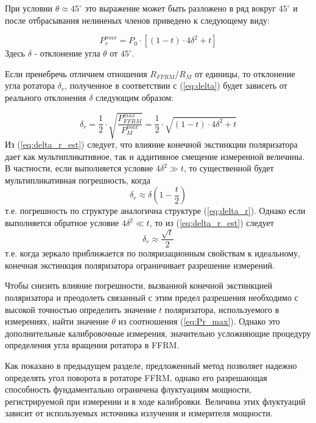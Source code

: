 \documentclass{article}
\begin{document}
При условии $\theta \approx 45^\circ$ это выражение может быть разложено в ряд вокруг $45^\circ$ и после отбрасывания нелиненых членов приведено к следующему виду: 

\begin{equation}
    \label{eq:Pr_max_1}
    P_r^{max}=P_0\cdot\left[(1-t)\cdot4\delta^2+t\right]
\end{equation}
Здесь $\delta$ - отклонение угла $\theta$ от $45^\circ$.

Если пренебречь отличием отношения $R_{FFRM}/R_M $ от единицы, то отклонение угла ротатора $\delta_r$, полученное в соответствии с (\ref{eq:delta}) будет зависеть от реального отклонения $\delta$ следующим образом:

\begin{equation}
    \label{eq:delta_r_est}
    \delta_r=\frac{1}{2}\cdot\sqrt{\frac{P_{FFRM}^{max}}{P_M^{max}}}=\frac{1}{2}\cdot\sqrt{(1-t)\cdot4\delta^2+t}
\end{equation}
Из (\ref{eq:delta_r_est}) следует, что влияние конечной экстинкции поляризатора дает как мультипликативное, так и аддитивное смещение измеренной величины. В частности, если выполняется условие $4\delta^2 \gg t$, то существенной будет мультипликативная погрешность, когда
\begin{equation}
    \delta_r\approx\delta\left(1-\frac{t}{2}\right)
\end{equation}
т.е. погрешность по структуре аналогична структуре (\ref{eq:delta_r}). Однако если выполняется обратное условие $4\delta^2\ll t$, то из (\ref{eq:delta_r_est}) следует
\begin{equation}
    \delta_r\approx\frac{\sqrt{t}}{2}
\end{equation}
т.е. когда зеркало приближается по поляризационным свойствам к идеальному, конечная экстинкция поляризатора ограничивает разрешение измерений.

Чтобы снизить влияние погрешности, вызванной конечной экстинкцией поляризатора и преодолеть связанный с этим предел разрешения необходимо с высокой точностью определить значение $t$ поляризатора, используемого в измерениях, найти значение $\theta$ из соотношения (\ref{eq:Pr_max}).
Однако это дополнительные калибровочные измерения, значительно усложняющие процедуру определения угла вращения ротатора в FFRM.

Как показано в предыдущем разделе, предложенный метод позволяет надежно определять угол поворота в ротаторе FFRM, однако его разрешающая способность фундаментально ограничена флуктуациям мощности, регистрируемой при измерении и в ходе калибровки.
Величина этих флуктуаций зависит от используемых источника излучения и измерителя мощности.
\end{document}

